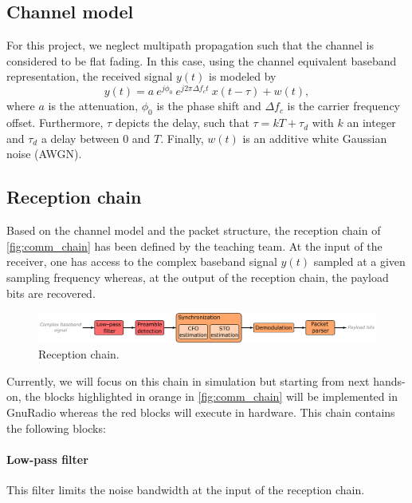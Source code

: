 \subsection{Channel model}
For this project, we neglect multipath propagation such that the channel is considered to be flat fading. In this case, using the channel equivalent baseband representation, the received signal $y(t)$ is modeled by
\begin{equation*}
    y(t) = a\: e^{j\phi_0}\: e^{j2\pi \Delta f_c t} \:x(t-\tau) + w(t),
\end{equation*}
where $a$ is the attenuation, $\phi_0$ is the phase shift and $\Delta f_c$ is the carrier frequency offset. Furthermore, $\tau$ depicts the delay, such that $\tau=kT+\tau_d$ with $k$ an integer and $\tau_d$ a delay between 0 and $T$. Finally, $w(t)$ is an additive white Gaussian noise (AWGN).



\subsection{Reception chain}
Based on the channel model and the packet structure, the reception chain of \autoref{fig:comm_chain} has been defined by the teaching team. At the input of the receiver, one has access to the complex baseband signal $y(t)$ sampled at a given sampling frequency whereas, at the output of the reception chain, the payload bits are recovered.

\begin{figure}[H]
    \centering
    \includegraphics[width=\textwidth]{figures/comm_chain.pdf}
    \caption{Reception chain.}
    \label{fig:comm_chain}
\end{figure}

Currently, we will focus on this chain in simulation but starting from next hands-on, the blocks highlighted in orange in \autoref{fig:comm_chain} will be implemented in GnuRadio whereas the red blocks will execute in hardware. This chain contains the following blocks:

\paragraph{Low-pass filter}
This filter limits the noise bandwidth at the input of the reception chain.

